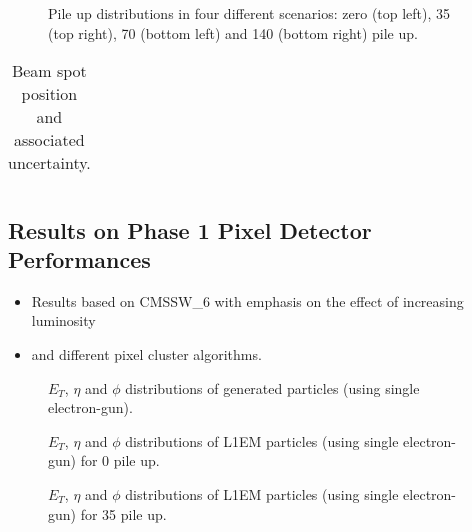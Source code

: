 \documentclass[a4paper,12pt,oneside]{article}
\begin{document}
                   \begin{figure}[!htb]
                     \centering
                     \caption{Pile up distributions in four different scenarios: zero (top left), 35 (top right), 70 (bottom
                       left) and 140 (bottom right) pile up.}
                     \label{}
                   \end{figure}
                   
                   \begin{table}[!htb]
                     \centering
                     \caption{Beam spot position and associated uncertainty.}
                     \label{}
                     \begin{tabular}{ccc}
                     \end{tabular}
                   \end{table}

        \subsection{Results on Phase 1 Pixel Detector Performances}

        \begin{itemize}
          \item Results based on CMSSW\_6 with emphasis on the effect of increasing luminosity
          \item and different pixel cluster algorithms.
        \end{itemize}

        \begin{figure}[!htb]
          \centering
          \caption{$E_{T}$, $\eta$ and $\phi$ distributions of generated particles (using single electron-gun).}
          \label{}
        \end{figure}

        \begin{figure}[!htb]
          \centering
          \caption{$E_{T}$, $\eta$ and $\phi$ distributions of L1EM particles (using single electron-gun) for 0 pile up.}
          \label{}
        \end{figure}

        \begin{figure}[!htb]
          \centering
          \caption{$E_{T}$, $\eta$ and $\phi$ distributions of L1EM particles (using single electron-gun) for 35 pile up.}
          \label{}
        \end{figure}
\end{document}
